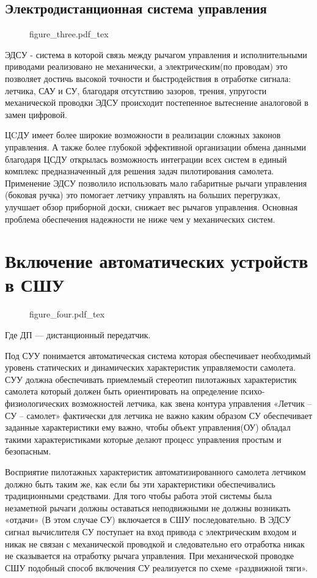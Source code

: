 \documentclass{article}
\begin{document}
\subsection{Электродистанционная система управления}
\begin{figure}[ht]
	{figure_three.pdf_tex}
\end{figure}

ЭДСУ - система в которой связь между рычагом управления и исполнительными
приводами реализовано не механически, а электрическим(по проводам) это
позволяет достичь высокой точности и быстродействия в отработке сигнала:
летчика, САУ и СУ, благодаря отсутствию зазоров, трения, упругости механической
проводки ЭДСУ происходит постепенное вытеснение аналоговой в замен цифровой.

ЦCДУ имеет более широкие возможности в реализации сложных законов управления. А
также более глубокой эффективной организации обмена данными благодаря ЦСДУ
открылась возможность интеграции всех систем в единый комплекс предназначенный
для решения задач пилотирования самолета. Применение ЭДСУ позволило
использовать мало габаритные рычаги управления (боковая ручка) это помогает
летчику управлять на больших перегрузках, улучшает обзор приборной доски,
снижает вес рычагов управления. Основная проблема обеспечения надежности не
ниже чем у механических систем.
\newpage

\section{Включение автоматических устройств в СШУ}
\begin{figure}[H]
    \centering
	{figure_four.pdf_tex}
\end{figure}

Где ДП --- дистанционный передатчик.

Под СУУ понимается автоматическая система которая обеспечивает необходимый
уровень статических и динамических характеристик управляемости самолета. СУУ
должна обеспечивать приемлемый стереотип пилотажных характеристик самолета
который должен быть ориентировать на определение психо-физиологических
возможностей летчика, как звена контура управления «Летчик -- СУ -- самолет»
фактически для летчика не важно каким образом СУ обеспечивает заданные
характеристики ему важно, чтобы объект управления(ОУ) обладал такими
характеристиками которые делают процесс управления простым и безопасным.

Восприятие пилотажных характеристик автоматизированного самолета летчиком
должно быть таким же, как если бы эти характеристики обеспечивались
традиционными средствами. Для того чтобы работа этой системы была незаметной
рычаги должны оставаться неподвижными не должны возникать «отдачи» (В этом
случае СУ) включается в СШУ последовательно. В ЭДСУ сигнал вычислителя СУ
поступает на вход привода с электрическим входом и никак не связан с
механической проводкой и следовательно его отработка никак не сказывается на
отработку рычага управления. При механической проводке СШУ подобный способ
включения СУ реализуется по схеме «раздвижной тяги».
\end{document}
